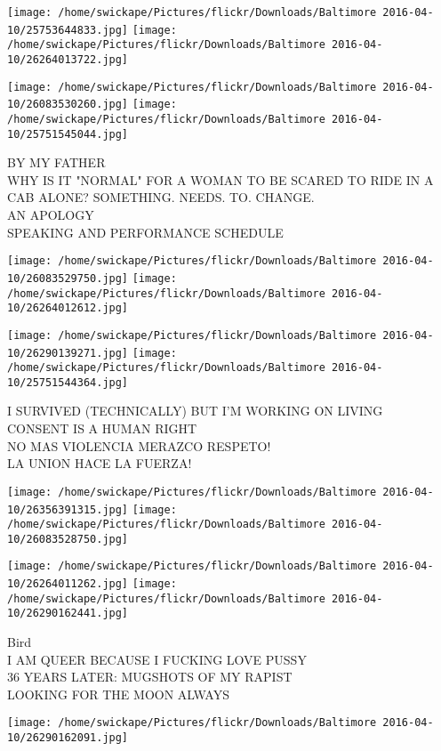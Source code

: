 \documentclass[10pt,letterpaper]{article}
\begin{document}
\texttt{[image: /home/swickape/Pictures/flickr/Downloads/Baltimore 2016-04-10/25753644833.jpg]}
\texttt{[image: /home/swickape/Pictures/flickr/Downloads/Baltimore 2016-04-10/26264013722.jpg]}

\texttt{[image: /home/swickape/Pictures/flickr/Downloads/Baltimore 2016-04-10/26083530260.jpg]}
\texttt{[image: /home/swickape/Pictures/flickr/Downloads/Baltimore 2016-04-10/25751545044.jpg]}

BY MY FATHER\\
WHY IS IT "NORMAL" FOR A WOMAN TO BE SCARED TO RIDE IN A CAB ALONE?  SOMETHING.  NEEDS.  TO.  CHANGE.\\
AN APOLOGY\\
SPEAKING AND PERFORMANCE SCHEDULE
\pagebreak

\texttt{[image: /home/swickape/Pictures/flickr/Downloads/Baltimore 2016-04-10/26083529750.jpg]}
\texttt{[image: /home/swickape/Pictures/flickr/Downloads/Baltimore 2016-04-10/26264012612.jpg]}

\texttt{[image: /home/swickape/Pictures/flickr/Downloads/Baltimore 2016-04-10/26290139271.jpg]}
\texttt{[image: /home/swickape/Pictures/flickr/Downloads/Baltimore 2016-04-10/25751544364.jpg]}

I SURVIVED (TECHNICALLY) BUT I'M WORKING ON LIVING\\
CONSENT IS A HUMAN RIGHT\\
NO MAS VIOLENCIA MERAZCO RESPETO!\\
LA UNION HACE LA FUERZA!
\pagebreak

\texttt{[image: /home/swickape/Pictures/flickr/Downloads/Baltimore 2016-04-10/26356391315.jpg]}
\texttt{[image: /home/swickape/Pictures/flickr/Downloads/Baltimore 2016-04-10/26083528750.jpg]}

\texttt{[image: /home/swickape/Pictures/flickr/Downloads/Baltimore 2016-04-10/26264011262.jpg]}
\texttt{[image: /home/swickape/Pictures/flickr/Downloads/Baltimore 2016-04-10/26290162441.jpg]}

Bird\\
I AM QUEER BECAUSE I FUCKING LOVE PUSSY\\
36 YEARS LATER: MUGSHOTS OF MY RAPIST\\
LOOKING FOR THE MOON ALWAYS
\pagebreak

\texttt{[image: /home/swickape/Pictures/flickr/Downloads/Baltimore 2016-04-10/26290162091.jpg]}
\end{document}
